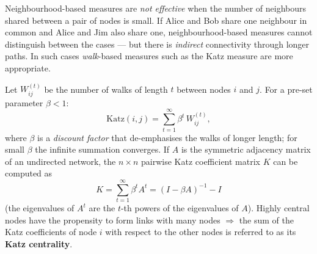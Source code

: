 \documentclass[11pt,a4paper]{article}
\theoremstyle{definition}
\begin{document}
\begin{defbox}
Neighbourhood-based measures are \emph{not effective} when the number of neighbours shared between a
pair of nodes is small. If Alice and Bob share one neighbour in common and Alice and Jim also share
one, neighbourhood-based measures cannot distinguish between the cases --- but there is
\emph{indirect} connectivity through longer paths. In such cases \emph{walk}-based measures such as
the Katz measure are more appropriate.

Let $W_{ij}^{(t)}$ be the number of walks of length $t$ between nodes $i$ and $j$. For a pre-set
parameter $\beta<1$:
\[ \mathrm{Katz}(i,j)=\sum_{t=1}^{\infty}\beta^{t}\,W_{ij}^{(t)}, \]
where $\beta$ is a \emph{discount factor} that de-emphasises the walks of longer length; for small
$\beta$ the infinite summation converges. If $A$ is the symmetric adjacency matrix of an undirected
network, the $n\times n$ pairwise Katz coefficient matrix $K$ can be computed as
\[ K=\sum_{t=1}^{\infty}\beta^{t}A^{t}=(I-\beta A)^{-1}-I \]
(the eigenvalues of $A^t$ are the $t$-th powers of the eigenvalues of $A$). Highly central nodes have
the propensity to form links with many nodes $\Rightarrow$ the sum of the Katz coefficients of node $i$
with respect to the other nodes is referred to as its \textbf{Katz centrality}.
\end{defbox}
\end{document}
